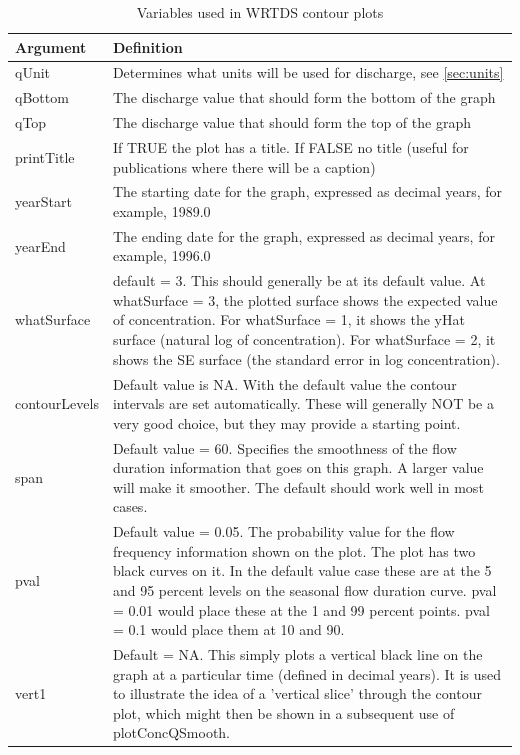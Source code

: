 \documentclass[a4paper,11pt]{article}\usepackage{graphicx, color}
\begin{document}
\begin{table}[ht]
\caption{Variables used in WRTDS contour plots  \label{tab:wrtdsContourVariables}}
\begin{tabularx}{\textwidth}{lX}
\hline
  \textbf{Argument} & \textbf{Definition} \\
\hline
qUnit & Determines what units will be used for discharge, see \ref{sec:units}\\
qBottom & The discharge value that should form the bottom of the graph \\
qTop & The discharge value that should form the top of the graph \\
printTitle & If TRUE the plot has a title.  If FALSE no title (useful for publications where there will be a caption) \\
yearStart & The starting date for the graph, expressed as decimal years, for example, 1989.0 \\
yearEnd & The ending date for the graph, expressed as decimal years, for example, 1996.0 \\
whatSurface & default = 3.  This should generally be at its default value.  At whatSurface = 3, the plotted surface shows the expected value of concentration.  For whatSurface = 1, it shows the yHat surface (natural log of concentration).  For whatSurface = 2, it shows the SE surface (the standard error in log concentration).    \\
contourLevels & Default value is NA.  With the default value the contour intervals are set automatically.  These will generally NOT be a very good choice, but they may provide a starting point.  \\
span & Default value = 60.  Specifies the smoothness of the flow duration information that goes on this graph.  A larger value will make it smoother.  The default should work well in most cases.\\
pval & Default value = 0.05.  The probability value for the flow frequency information shown on the plot.  The plot has two black curves on it.  In the default value case these are at the 5 and 95 percent levels on the seasonal flow duration curve.  pval = 0.01 would place these at the 1 and 99 percent points.  pval = 0.1 would place them at 10  and 90.\\
vert1 & Default = NA.  This simply plots a vertical black line on the graph at a particular time (defined in decimal years).  It is used to illustrate the idea of a 'vertical slice' through the contour plot, which might then be shown in a subsequent use of plotConcQSmooth.  \\

\end{tabularx}
\end{table}
\end{document}
